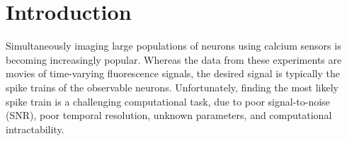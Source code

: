 \section{Introduction}


Simultaneously imaging large populations of neurons using calcium sensors is becoming increasingly popular.
Whereas the data from these experiments are movies of time-varying fluorescence signals, the desired signal is typically the spike trains of the observable neurons.  %
% 
% 
Unfortunately, finding the most likely spike train is a challenging computational task, due to poor signal-to-noise (SNR), poor temporal resolution, unknown parameters, and computational intractability.
% 
% 
